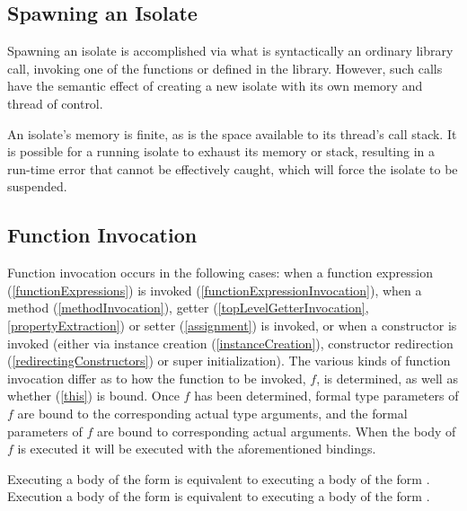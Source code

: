 \documentclass{article}
\begin{document}
\subsection{Spawning an Isolate}

\LMHash{}
Spawning an isolate is accomplished via what is syntactically an ordinary library call, invoking one of the functions  or  defined in the  library.
However, such calls have the semantic effect of creating a new isolate with its own memory and thread of control.

\LMHash{}
An isolate's memory is finite, as is the space available to its thread's call stack.
It is possible for a running isolate to exhaust its memory or stack, resulting in a run-time error that cannot be effectively caught, which will force the isolate to be suspended.



\subsection{Function Invocation}

\LMHash{}
Function invocation occurs in the following cases:
when a function expression (\ref{functionExpressions}) is invoked (\ref{functionExpressionInvocation}),
when a method (\ref{methodInvocation}), getter (\ref{topLevelGetterInvocation}, \ref{propertyExtraction}) or setter (\ref{assignment}) is invoked,
or when a constructor is invoked
(either via instance creation (\ref{instanceCreation}), constructor redirection (\ref{redirectingConstructors}) or super initialization).
The various kinds of function invocation differ as to how the function to be invoked, $f$, is determined, as well as whether \THIS{} (\ref{this}) is bound.
Once $f$ has been determined,
formal type parameters of $f$ are bound to the corresponding actual type arguments,
and the formal parameters of $f$ are bound to corresponding actual arguments.
When the body of $f$ is executed it will be executed with the aforementioned bindings.

\LMHash{}
Executing a body of the form  is equivalent to executing a body of the form .
Execution a body of the form  is equivalent to executing a body of the form .
\end{document}
